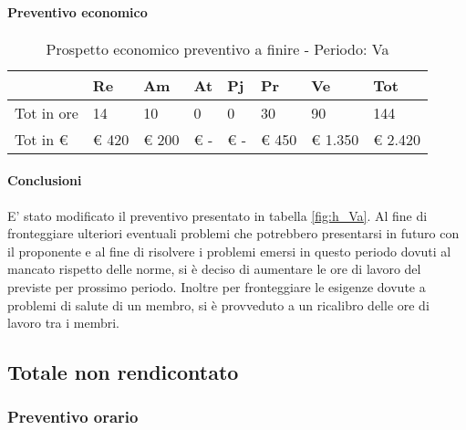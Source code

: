 			\paragraph{Preventivo economico}
				\begin{table}[H] \begin{center} \begin{tabular}{llllllll}
										\toprule
											&	\textbf{Re}	&	\textbf{Am}	&	\textbf{At}	&	\textbf{Pj}	&	\textbf{Pr}	&	\textbf{Ve}	&	\textbf{Tot}	 \\

										\midrule
										Tot in ore	&	14		&	10		&	0		&	0		&	30		&	90		&	144	\\
										Tot in €	&	 € 420 		 & 	 € 200 		 & 	 € -   		 & 	 € -   		 & 	 € 450 		 & 	 € 1.350 		 & 	 € 2.420 	\\
										\bottomrule
										\end{tabular} \end{center} \caption{Prospetto economico preventivo a finire - Periodo:
										Va
										}\end{table}
			\paragraph{Conclusioni}	E' stato modificato il preventivo presentato in tabella \ref{fig:h_Va}.
			Al fine di fronteggiare ulteriori eventuali problemi che potrebbero presentarsi in futuro con il proponente e al fine di risolvere i problemi emersi in questo periodo dovuti al mancato rispetto delle norme, si è deciso di aumentare le ore di lavoro del \responsabile{} previste per prossimo periodo. Inoltre per fronteggiare le esigenze dovute a problemi di salute di un membro, si è provveduto a un ricalibro delle ore di lavoro tra i membri.
	\newpage
	\subsection{Totale non rendicontato}
		\subsubsection{Preventivo orario}



